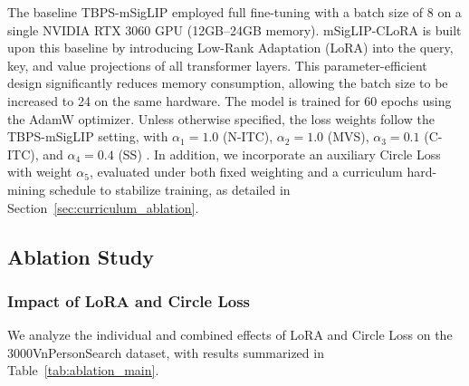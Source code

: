\documentclass[conference]{IEEEtran}
\begin{document}
The baseline TBPS-mSigLIP\cite{tran2025multilingual} employed full fine-tuning with a batch size of 8 on a single NVIDIA RTX 3060 GPU (12GB–24GB memory). mSigLIP-CLoRA is built upon this baseline by introducing Low-Rank Adaptation (LoRA) into the query, key, and value projections of all transformer layers. This parameter-efficient design significantly reduces memory consumption, allowing the batch size to be increased to 24 on the same hardware. The model is trained for 60 epochs using the AdamW optimizer. Unless otherwise specified, the loss weights follow the TBPS-mSigLIP setting, with $\alpha_1=1.0$ (N-ITC), $\alpha_2=1.0$ (MVS), $\alpha_3=0.1$ (C-ITC), and $\alpha_4=0.4$ (SS) \cite{tran2025multilingual}. In addition, we incorporate an auxiliary Circle Loss with weight $\alpha_5$, evaluated under both fixed weighting and a curriculum hard-mining schedule to stabilize training, as detailed in Section~\ref{sec:curriculum_ablation}.

\subsection{Ablation Study}

\subsubsection{Impact of LoRA and Circle Loss}
We analyze the individual and combined effects of LoRA and Circle Loss on the 3000VnPersonSearch dataset, with results summarized in Table~\ref{tab:ablation_main}.

\begin{table}[htbp]
    \centering
    \vspace{-0.5em}
    \caption{Ablation study on the impact of LoRA and Circle Loss on the 3000VnPersonSearch dataset. Best results are in \textbf{bold}.}
    \label{tab:ablation_main}
    \vspace{-1.5em}
\end{table}
\end{document}
